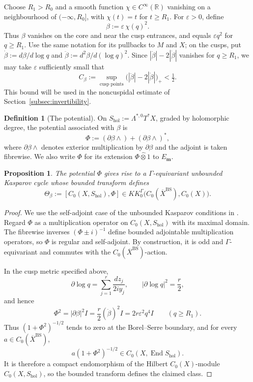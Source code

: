 \documentclass[11pt]{article}
\theoremstyle{definition}
\newtheorem*{definition}{Definition}
\theoremstyle{plain}
\numberwithin{equation}{section}
\newtheorem{proposition}[theorem]{Proposition}
\newcommand{\BS}{\mathrm{BS}}
\begin{document}
Choose $R_1>R_0$ and a smooth function
$\chi\in C^\infty(\mathbb R)$ vanishing on a neighbourhood of
$(-\infty,R_0]$, with $\chi(t)=t$ for $t\geq R_1$.
For $\varepsilon>0$, define
\[
 \beta:=\varepsilon\,\chi(q)^2.
\]
Thus $\beta$ vanishes on the core and near the cusp entrances,
and equals $\varepsilon q^2$ for $q\geq R_1$.
Use the same notation for its pullbacks to $M$ and $X$;
on the cusps, put
$\dot\beta:=d\beta/d\log q$ and
$\ddot\beta:=d^2\beta/d(\log q)^2$.
Since $|\ddot\beta|-2|\dot\beta|$ vanishes for $q\geq R_1$,
we may take $\varepsilon$ sufficiently small that
\begin{equation}\label{eq:normalization}
 C_\beta:=\sup_{\text{cusp points}}
          \bigl(|\ddot\beta|-2|\dot\beta|\bigr)_+<\tfrac12.
\end{equation}
This bound will be used in the noncuspidal estimate of
Section~\ref{subsec:invertibility}.

\begin{definition}[The potential]
On $S_{\mathrm{hol}}:=\Lambda^{*,0}T^*X$, graded by
holomorphic degree, the potential associated with $\beta$ is
\begin{equation}\label{eq:B}
 \Phi:=(\partial\beta\wedge)+(\partial\beta\wedge)^*,
\end{equation}
where $\partial\beta\wedge$ denotes exterior multiplication
by $\partial\beta$ and the adjoint is taken fibrewise.
We also write $\Phi$ for its extension
$\Phi\widehat\otimes1$ to $E_{\boldsymbol m}$.
\end{definition}

\begin{proposition}\label{prop:potential-class}
The potential $\Phi$ gives rise to a $\Gamma$-equivariant
unbounded Kasparov cycle whose bounded transform defines
\begin{equation}\label{eq:potential-class}
 \Theta_\beta:=[C_0(X,S_{\mathrm{hol}}),\Phi]
       \in KK_0^\Gamma
       \bigl(C_0(\overline X^{\BS}),C_0(X)\bigr).
\end{equation}
\end{proposition}

\begin{proof}
We use the self-adjoint case of the unbounded Kasparov
conditions in \cite[Definition~2.3]{vanDenDungen}.
Regard $\Phi$ as a multiplication operator on
$C_0(X,S_{\mathrm{hol}})$ with its maximal domain.
The fibrewise inverses $(\Phi\pm i)^{-1}$ define bounded
adjointable multiplication operators, so $\Phi$ is regular
and self-adjoint.  By construction, it is odd and
$\Gamma$-equivariant and commutes with the
$C_0(\overline X^{\BS})$-action.

In the cusp metric specified above,
\[
 \partial\log q=\sum_{j=1}^r\frac{dz_j}{2iy_j},
 \qquad |\partial\log q|^2=\frac r2,
\]
and hence
\[
 \Phi^2=|\partial\beta|^2I
       =\frac r2(\dot\beta)^2I
       =2r\varepsilon^2q^4I\qquad(q\geq R_1).
\]
Thus $(1+\Phi^2)^{-1/2}$ tends to zero at the
Borel--Serre boundary, and for every
$a\in C_0(\overline X^{\BS})$,
\[
 a(1+\Phi^2)^{-1/2}
      \in C_0(X,\operatorname{End}S_{\mathrm{hol}}).
\]
It is therefore a compact endomorphism of the Hilbert
$C_0(X)$-module $C_0(X,S_{\mathrm{hol}})$, so the bounded
transform defines the claimed class.
\end{proof}
\end{document}
